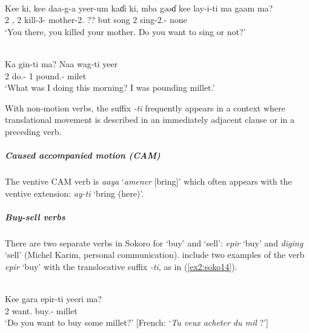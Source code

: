 \ea\label{ex2:soko7}
 \\
\gll Kee ki, kee daa-g-a yeer-um kaɗi ki, mba gəəɗ kee lay-i-ti ma gaam ma? \\
2 , 2 kill-3- mother-2. ??  but song 2 sing-2.-  none 	\\
\glt `You there, you killed your mother. Do you want to sing or not?' 

\ex\label{ex2:soko8}
 \\
\gll Ka gin-ti ma? Naa wag-ti yeer	 \\
2 do.-  1 pound.- milet		 \\
\glt `What was I doing this morning? I was pounding millet.' 
\z

With non-motion verbs, the suffix \textit{-ti} frequently appears in a context where translational movement is described in an immediately adjacent clause or in a preceding verb.

\subparagraph{Caused accompanied motion (CAM)}

The ventive CAM verb is \textit{aaya} `\textit{amener} [bring]' which often appears with the ventive extension: \textit{ay-ti} `bring (here)'. 

\subparagraph{Buy-sell verbs}

There are two separate verbs in Sokoro for `buy' and `sell': \textit{epir} `buy' and \textit{diging} `sell' (Michel Karim, personal communication). \citet{yarangaEsquiseGrammaticaleLanguen.d.} include two examples of the verb \textit{epir} `buy' with the translocative suffix \textit{-ti}, as in (\ref{ex2:soko14}).

\ea\label{ex2:soko14}
 \\
\gll Kee gara epir-ti yeeri ma?	\\
2 want. buy.- millet 	\\
\glt `Do you want to buy some millet?' [French: `\textit{Tu veux acheter du mil} ?']
\z 


